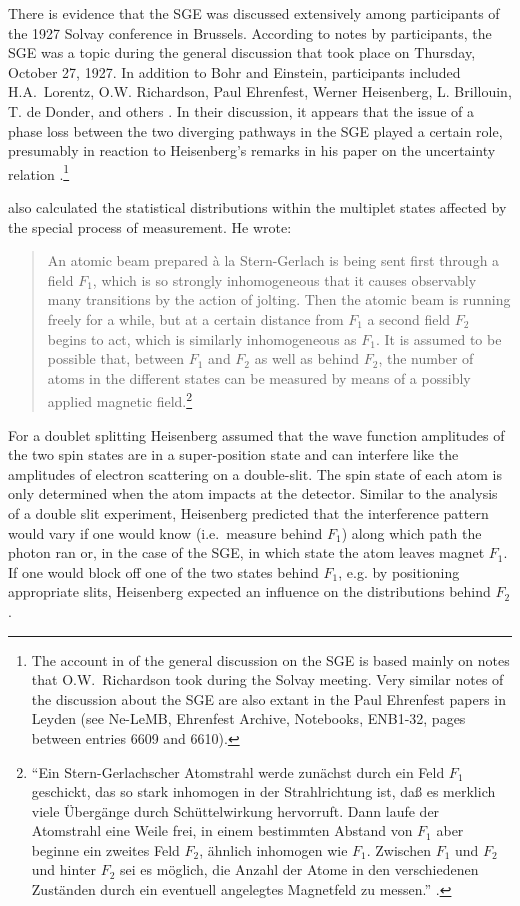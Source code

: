 \documentclass{article}
\begin{document}
There is evidence that the SGE was discussed extensively among participants of the 1927 Solvay conference in Brussels. According to notes by participants, the SGE was a topic during the general discussion that took place on Thursday, October 27, 1927. In addition to Bohr and Einstein, participants included H.A.~Lorentz, O.W. Richardson, Paul Ehrenfest, Werner Heisenberg, L. Brillouin, T. de Donder, and others \cite[pp.~436, 478, 500]{BacciagaluppiGEtAl2009Crossroads}. In their discussion, it appears that the issue of a phase loss between the two diverging pathways in the SGE played a certain role, presumably in reaction  to Heisenberg's remarks in his paper on the uncertainty relation \citep{HeisenbergW1927Inhalt}.\footnote{The account in \citep{BacciagaluppiGEtAl2009Crossroads} of the general discussion on the SGE is based mainly on notes that O.W.~Richardson took during the Solvay meeting. Very similar notes of the discussion about the SGE are also extant in the Paul Ehrenfest papers in Leyden (see Ne-LeMB, Ehrenfest Archive, Notebooks, ENB1-32, pages between entries 6609 and 6610).}

\cite{HeisenbergW1927Inhalt} also calculated the statistical distributions within the multiplet states affected by the special process of measurement. He wrote:
\begin{quote}
An atomic beam prepared \`a la Stern-Gerlach is being sent first through a field $F_1$, which is so strongly inhomogeneous that it causes observably many transitions by the action of jolting. Then the atomic beam is running freely for a while, but at a certain distance from $F_1$ a second field $F_2$ begins to act, which is similarly inhomogeneous as $F_1$. It is assumed to be possible that, between $F_1$ and $F_2$ as well as behind $F_2$, the number of atoms in the different states can be measured by means of a possibly applied magnetic field.\footnote{``Ein Stern-Gerlachscher Atomstrahl werde zunächst durch ein Feld $F_1$ geschickt, das so stark inhomogen in der Strahlrichtung ist, da{\ss} es merklich viele Übergänge durch \glqq Schüttelwirkung{\grqq} hervorruft. Dann laufe der Atomstrahl eine Weile frei, in einem bestimmten Abstand von $F_1$ aber beginne ein zweites Feld $F_2$, ähnlich inhomogen wie $F_1$. Zwischen $F_1$ und $F_2$ und hinter $F_2$ sei es möglich, die Anzahl der Atome in den verschiedenen Zuständen durch ein eventuell angelegtes Magnetfeld zu messen.'' \cite[p.~182]{HeisenbergW1927Inhalt}.}
\end{quote}
For a doublet splitting Heisenberg assumed that the wave function amplitudes of the two spin states are in a super-position state and can interfere like the amplitudes of electron scattering on a double-slit. The spin state of each atom is only determined when the atom impacts at the detector. Similar to the analysis of a double slit experiment, Heisenberg predicted that the interference pattern would vary if one would know (i.e.\ measure behind $F_1$) along which path the photon ran or, in the case of the SGE, in which state the atom leaves magnet $F_1$. If one would block off one of the two states behind $F_1$, e.g. by positioning appropriate slits, Heisenberg expected an influence on the distributions behind $F_2$. 
\end{document}
